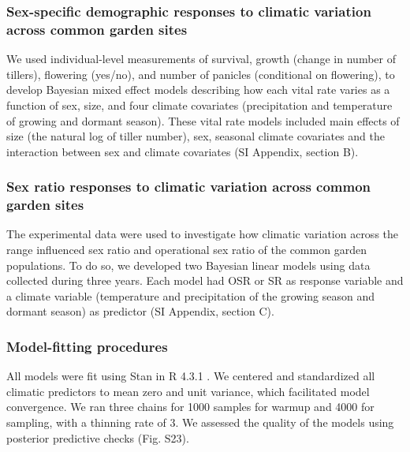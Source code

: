 \documentclass[9pt,twocolumn,twoside,lineno]{pnas-new}
\newcommand{\tom}[2]{{\color{red}{#1}}\footnote{\textit{\color{red}{#2}}}}
\begin{document}
\subsubsection*{Sex-specific demographic responses to climatic variation across common garden sites}
We used individual-level measurements of survival, growth (change in number of tillers), flowering (yes/no), and number of panicles (conditional on flowering),  to develop Bayesian mixed effect models describing how each vital rate varies as a function of sex, size, and four climate covariates (precipitation and temperature of growing and dormant season). 
These vital rate models included main effects of size (the natural log of tiller number), sex,  seasonal climate covariates and the interaction between sex and climate covariates (SI Appendix, section B). 

\subsubsection*{Sex ratio responses to climatic variation across common garden sites}
The experimental data were used to investigate how climatic variation across the range influenced sex ratio and operational sex ratio of the common garden populations. 
To do so, we developed  two Bayesian linear models using  data collected during three years.
Each model had OSR or SR as response variable and a climate variable (temperature and precipitation of the growing season and dormant season) as predictor (SI Appendix, section C). 


\subsubsection*{Model-fitting procedures}
All models were fit using Stan \citep{rstan} in R 4.3.1 \citep{RCoreteam}.
We centered and standardized all climatic predictors to mean zero and unit variance, which facilitated model convergence.
We ran three chains for 1000 samples for warmup and 4000 for sampling, with a thinning rate of 3.
We assessed the quality of the models using posterior predictive checks \citep{piironen2017comparison} (Fig. S23).
 
\end{document}
